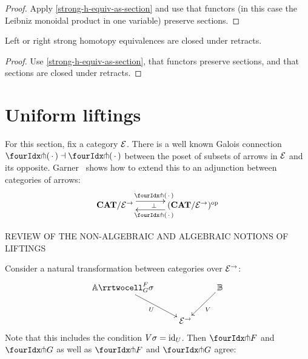 \documentclass[reqno,10pt,a4paper,oneside]{amsart}
\begin{document}
\begin{proof}
Apply \cref{strong-h-equiv-as-section} and use that functors (in this case the Leibniz monoidal product in one variable) preserve sections.
\end{proof}

\begin{proposition}
\label{strong-h-equiv-closed-under-retract}
Left or right strong homotopy equivalences are closed under retracts.
\end{proposition}

\begin{proof}
Use \cref{strong-h-equiv-as-section},  that functors preserve sections, and that  sections are closed under retracts.
\end{proof}

\section{Uniform liftings}


For this section, fix a category $\mathcal{E}$.
There is a well known Galois connection $\liftr{\brarghole} \dashv \liftl{\brarghole}$ between the poset of subsets of arrows in $\mathcal{E}$ and its opposite.
Garner~\cite{garner:small-object-argument} shows how to extend this to an adjunction between categories of arrows:
\begin{equation}
\label{garner-adjunction}
\begin{gathered}
\xymatrix@C+1em{
  \CAT/\catE^{\to}
  \ar@<5pt>[r]^{\liftl{\brarghole}}
  \ar@{}[r]|{\bot}
&
  (\CAT/\catE^{\to})^{\op}
  \ar@<5pt>[l]^{\liftr{\brarghole}}
}
\end{gathered}
\end{equation}


REVIEW OF THE NON-ALGEBRAIC AND ALGEBRAIC NOTIONS OF LIFTINGS



\begin{lemma}
Consider a natural transformation between categories over $\mathcal{E}^{\to}$:
\[
\xymatrix{
  \cat{A}
  \rrtwocell_G^F{\sigma}
 \ar[dr]_{U}
&&
  \cat{B}
  \ar[dl]^{V}
\\&
  \catE^{\to}
}
\]
Note that this includes the condition $V \sigma = \operatorname{id}_U$.
Then $\liftr{F}$ and $\liftr{G}$ as well as $\liftl{F}$ and $\liftl{G}$ agree:
\end{lemma}
\end{document}
